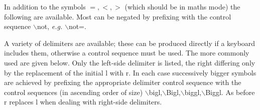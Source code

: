 
In addition to the symbols $=,<,>$ (which should be in maths mode)
the following are available. Most can be negated by prefixing
with the control sequence $\backslash$not, {\it e.g.} $\backslash$not=.


     

A variety of delimiters are available; these can be produced directly if
a keyboard includes them, otherwise a control sequence must be used.
The more commonly used are given below.
Only the left-side delimiter is listed, the right differing
only by the replacement of the initial l with r. In each case successively bigger
symbols are achieved by prefixing the appropriate delimiter control
sequence with the control sequences (in ascending order of size)
$\backslash$bigl,$\backslash$Bigl,$\backslash$biggl,$\backslash$Biggl. As before r replaces l when dealing with
right-side delimiters.


\line{~~~~~~$\backslash$lbrack                  \hfil\%  $[$~~~~~~}
\bye



